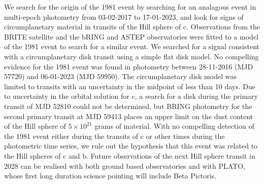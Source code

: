 {We search for the origin of the 1981 event by searching for an analagous event in multi-epoch photometry from 03-02-2017 to 17-01-2023, and look for signs of circumplanetary material in transits of the Hill sphere of \pic c.}
{Observations from the BRITE satellite and the bRING and ASTEP observatories were fitted to a model of the 1981 event to search for a similar event.
%
We searched for a signal consistent with a circumplanetary disk transit using a simple flat disk model.}
{No compelling evidence for the 1981 event was found in photometry between 28-11-2016 (MJD 57720) and 06-01-2023 (MJD 59950).
%
The circumplanetary disk model was limited to transits with an uncertainty in the midpoint of less than 10 days.
%
Due to uncertainty in the orbital solution for c, a search for a disk during the primary transit of MJD 52810 could not be determined, but BRING photometry for the second primary transit at MJD 59413 places an upper limit on the dust content of the Hill sphere of $5\times10^{21}$ grams of material.}
{With no compelling detection of the 1981 event either during the transits of c or other times during the photometric time series, we rule out the hypothesis that this event was related to the Hill spheres of c and b.
%
%
Future observations of the next Hill sphere transit in 2028 can be realised with both ground based observatories and with PLATO, whose first long duration science pointing will include Beta Pictoris.
} 


